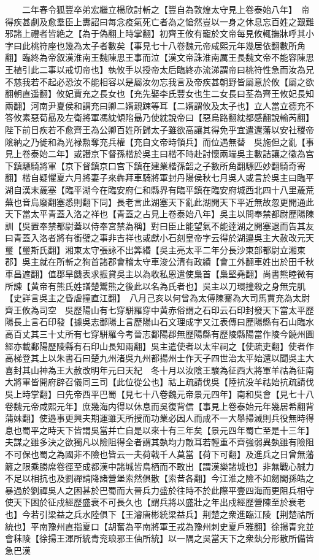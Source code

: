 　　二年春令狐豐卒弟宏繼立楊欣討斬之【豐自為敦煌太守見上卷泰始八年】　帝得疾甚劇及愈羣臣上夀詔曰每念疫氣死亡者為之愴然豈以一身之休息忘百姓之艱難邪諸上禮者皆絶之【為于偽翻上時掌翻】初齊王攸有寵於文帝每見攸輒撫牀呼其小字曰此桃符座也幾為太子者數矣【事見七十八卷魏元帝咸熙元年幾居依翻數所角翻】臨終為帝叙漢淮南王魏陳思王事而泣【漢文帝誅淮南厲王長魏文帝不能容陳思王植引此二事以戒切帝也】執攸手以授帝太后臨終亦流涕謂帝曰桃符性急而汝為兄不慈我若不起必恐汝不能相容以是屬汝勿忘我言及帝疾甚朝野皆屬意於攸【屬之欲翻朝直遥翻】攸妃賈充之長女也【充先娶李氏豐女也生二女長曰荃為齊王攸妃長知兩翻】河南尹夏侯和謂充曰卿二婿親踈等耳【二婿謂攸及太子也】立人當立德充不答攸素惡荀勗及左衛將軍馮紞傾陷朂乃使紞說帝曰【惡烏路翻紞都感翻說輸芮翻】陛下前日疾若不愈齊王為公卿百姓所歸太子雖欲高讓其得免乎宜遣還藩以安社稷帝隂納之乃徙和為光禄勲奪充兵權【充自文帝時領兵】而位遇無替　吳施但之亂【事見上卷泰始二年】或譖京下督孫楷於吳主曰楷不時赴討懷兩端吳主數詰讓之徵為宫下鎮驃騎將軍【京下督鎮京口宫下鎮在建業楷孫韶之子數所角翻驃匹妙翻騎奇寄翻】楷自疑懼夏六月將妻子來犇拜車騎將軍封丹陽侯秋七月吳人或言於吳主曰臨平湖自漢末薉塞【臨平湖今在臨安府仁和縣界有臨平鎮在臨安府城西北四十八里薉荒蕪也音烏廢翻塞悉則翻下同】長老言此湖塞天下亂此湖開天下平近無故忽更開通此天下當太平青蓋入洛之祥也【青蓋之占見上卷泰始八年】吳主以問奉禁都尉歷陽陳訓【吳置奉禁都尉蓋以侍奉宮禁為稱】對曰臣止能望氣不能逹湖之開塞退而告其友曰青蓋入洛者將有銜璧之事非吉祥也或獻小石刻皇帝字云得於湖邉吳主大赦改元天璽【璽斯氏翻】湘東太守張詠不出筭緡【吳主亮太平二年分長沙東部都尉立湘東郡】吳主就在所斬之狥首諸郡會稽太守車浚公清有政績【會工外翻車姓出於田千秋車昌遮翻】值郡旱饑表求振貸吳主以為收私恩遣使梟首【梟堅堯翻】尚書熊睦微有所諫【黄帝有熊氏姓譜楚鬻熊之後此以名為氏者也】吳主以刀環撞殺之身無完肌【史詳言吳主之昏虐撞直江翻】　八月己亥以何曾為太傅陳騫為大司馬賈充為太尉齊王攸為司空　吳歷陽山有七穿駢羅穿中黄赤俗謂之石印云石印封發天下當太平歷陽長上言石印發【據吳志鄱陽上言歷陽山石文理成字又江表傳曰歷陽縣有石山臨水高百丈其三十丈所有七穿駢羅今考晉志鄱陽郡無歷陽縣有歷陵縣陽當作陵今饒州圖經亦載鄱陽歷陵縣有石印山長知兩翻】吳主遣使者以太牢祠之【使疏吏翻】使者作高梯登其上以朱書石曰楚九州渚吳九州都揚州士作天子四世治太平始還以聞吳主大喜封其山神為王大赦改明年元曰天紀　冬十月以汝陰王駿為征西大將軍羊祜為征南大將軍皆開府辟召儀同三司【此位從公也】祜上疏請伐吳【陸抗没羊祜始抗疏請伐吳上時掌翻】曰先帝西平巴蜀【見七十八卷魏元帝景元四年】南和吳會【見七十八卷魏元帝咸熙元年】庶幾海内得以休息而吳復背信【事見上卷泰始元年幾居希翻背蒲妹翻】使邉事更興夫期運雖天所授而功業必因人而成不一大舉掃滅則兵役無時得息也蜀平之時天下皆謂吳當并亡自是以來十有三年矣【景元四年蜀亡至是十三年】夫謀之雖多決之欲獨凡以險阻得全者謂其埶均力敵耳若輕重不齊強弱異埶雖有險阻不可保也蜀之為國非不險也皆云一夫荷戟千人莫當【荷下可翻】及進兵之日曾無藩籬之限乘勝席卷徑至成都漢中諸城皆鳥栖而不敢出【謂漢樂諸城也】非無戰心誠力不足以相抗也及劉禪請降諸營堡索然俱散【索昔各翻】今江淮之險不如劒閣孫皓之暴過於劉禪吳人之困甚於巴蜀而大晉兵力盛於往時不於此際平壹四海而更阻兵相守使天下困於征戍經歷盛衰不可長久也【謂兵將以盛壯之年出戍經歷營陳至於衰老也】今若引梁益之兵水陸俱下【王濬唐彬統梁益兵】荆楚之衆進臨江陵【荆楚祜所統也】平南豫州直指夏口【胡奮為平南將軍王戎為豫州刺史夏戶雅翻】徐揚青兖並會秣陵【徐揚王渾所統青兖琅邪王伷所統】以一隅之吳當天下之衆埶分形散所備皆急巴漢